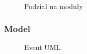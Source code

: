 \begin{figure}[!ht]
	\caption{\label{fig:flow_chart}Podział na moduły}
\end{figure}

\subsubsection{Model}

\begin{figure}[h]
	\caption{\label{fig:subcaption_example}Event UML}
\end{figure}

